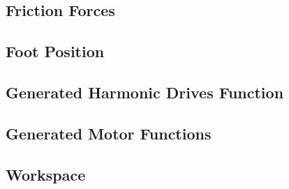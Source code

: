 \subsection{Friction Forces}

\subsection{Foot Position}


\subsection{Generated Harmonic Drives Function}

\subsection{Generated Motor Functions}

\subsection{Workspace}
